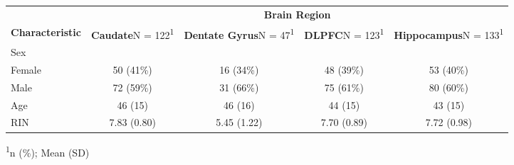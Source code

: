 \captionsetup[table]{labelformat=empty,skip=1pt}
\setlength{\LTpost}{0mm}
\begin{longtable}{lcccc}
\toprule
 & \multicolumn{4}{c}{\textbf{Brain Region}} \\ 
\cmidrule(lr){2-5}
\textbf{Characteristic} & \textbf{Caudate}N = 122\textsuperscript{1} & \textbf{Dentate Gyrus}N = 47\textsuperscript{1} & \textbf{DLPFC}N = 123\textsuperscript{1} & \textbf{Hippocampus}N = 133\textsuperscript{1} \\ 
\midrule
Sex &  &  &  &  \\ 
Female & 50 (41\%) & 16 (34\%) & 48 (39\%) & 53 (40\%) \\ 
Male & 72 (59\%) & 31 (66\%) & 75 (61\%) & 80 (60\%) \\ 
Age & 46 (15) & 46 (16) & 44 (15) & 43 (15) \\ 
RIN & 7.83 (0.80) & 5.45 (1.22) & 7.70 (0.89) & 7.72 (0.98) \\ 
\bottomrule
\end{longtable}
\begin{minipage}{\linewidth}
\textsuperscript{1}n (\%); Mean (SD)\\
\end{minipage}

